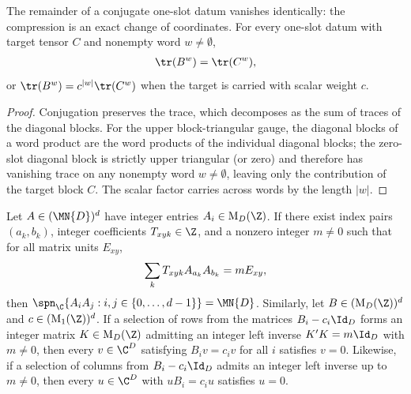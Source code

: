 \begin{theorem}%
    \label{thm:asymex_one_slot}
    \leanok
    The remainder of a conjugate one-slot datum vanishes identically: the
    compression is an exact change of coordinates. For every one-slot
    datum with target tensor $C$ and nonempty word $w \ne \emptyset$,
    \begin{align}
        \tr(B^w) = \tr(C^w), \notag
    \end{align}
    or $\tr(B^w) = c^{|w|}\tr(C^w)$ when the target is carried with scalar
    weight $c$.
\end{theorem}

\begin{proof}
    \leanok
    Conjugation preserves the trace, which decomposes as the sum of traces of
    the diagonal blocks. For the upper block-triangular gauge, the diagonal
    blocks of a word product are the word products of the individual diagonal
    blocks; the zero-slot diagonal block is strictly upper triangular (or zero)
    and therefore has vanishing trace on any nonempty word $w \ne \emptyset$,
    leaving only the contribution of the target block $C$. The scalar factor
    carries across words by the length $|w|$.
\end{proof}

\begin{theorem}%
    \label{thm:asymex_int_certificates}
    \leanok
    Let $A \in (\MN{D})^d$ have integer entries $A_i \in \mathrm{M}_D(\Z)$.
    If there exist index pairs $(a_k, b_k)$, integer coefficients
    $T_{xyk} \in \Z$, and a nonzero integer $m \ne 0$ such that for all matrix
    units $E_{xy}$,
    \begin{align}
        \sum_k T_{xyk} A_{a_k} A_{b_k} = m E_{xy}, \notag
    \end{align}
    then $\spn_\C\{A_i A_j : i,j \in \{0,\dots,d-1\}\} = \MN{D}$.
    Similarly, let $B \in (\mathrm{M}_D(\Z))^d$ and $c \in (\mathrm{M}_1(\Z))^d$.
    If a selection of rows from the matrices $B_i - c_i \Id_D$ forms an
    integer matrix $K \in \mathrm{M}_D(\Z)$ admitting an integer left inverse
    $K' K = m \Id_D$ with $m \ne 0$, then every $v \in \C^D$ satisfying
    $B_i v = c_i v$ for all $i$ satisfies $v = 0$.
    Likewise, if a selection of columns from $B_i - c_i \Id_D$ admits an
    integer left inverse up to $m \ne 0$, then every $u \in \C^D$ with
    $u B_i = c_i u$ satisfies $u = 0$.
\end{theorem}


